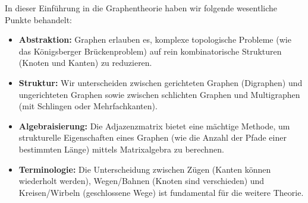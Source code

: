 \begin{nice-box}
In dieser Einführung in die Graphentheorie haben wir folgende wesentliche Punkte behandelt:
\begin{itemize}
    \item \textbf{Abstraktion:} Graphen erlauben es, komplexe topologische Probleme (wie das Königsberger Brückenproblem) auf rein kombinatorische Strukturen (Knoten und Kanten) zu reduzieren.
    \item \textbf{Struktur:} Wir unterscheiden zwischen gerichteten Graphen (Digraphen) und ungerichteten Graphen sowie zwischen schlichten Graphen und Multigraphen (mit Schlingen oder Mehrfachkanten).
    \item \textbf{Algebraisierung:} Die Adjazenzmatrix bietet eine mächtige Methode, um strukturelle Eigenschaften eines Graphen (wie die Anzahl der Pfade einer bestimmten Länge) mittels Matrixalgebra zu berechnen.
    \item \textbf{Terminologie:} Die Unterscheidung zwischen Zügen (Kanten können wiederholt werden), Wegen/Bahnen (Knoten sind verschieden) und Kreisen/Wirbeln (geschlossene Wege) ist fundamental für die weitere Theorie.
\end{itemize}
\end{nice-box}